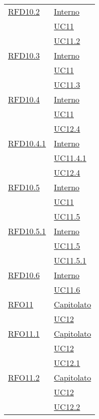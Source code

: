 \begin{longtable}{|>{\centering}m{5cm}|m{5cm}<{\centering}|}
\hyperlink{RFD10.2}{RFD10.2} & \hyperlink{Interno}{Interno}\\
& \hyperref[UC11]{UC11}\\
& \hyperref[UC11.2]{UC11.2}\\ \hline

\hyperlink{RFD10.3}{RFD10.3} & \hyperlink{Interno}{Interno}\\
& \hyperref[UC11]{UC11}\\
& \hyperref[UC11.3]{UC11.3}\\ \hline

\hyperlink{RFD10.4}{RFD10.4} & \hyperlink{Interno}{Interno}\\
& \hyperref[UC11]{UC11}\\
& \hyperref[UC12.4]{UC12.4}\\ \hline

\hyperlink{RFD10.4.1}{RFD10.4.1} & \hyperlink{Interno}{Interno}\\
& \hyperref[UC11.4.1]{UC11.4.1}\\
& \hyperref[UC12.4]{UC12.4}\\ \hline

\hyperlink{RFD10.5}{RFD10.5} & \hyperlink{Interno}{Interno}\\
& \hyperref[UC11]{UC11}\\
& \hyperref[UC11.5]{UC11.5}\\ \hline

\hyperlink{RFD10.5.1}{RFD10.5.1} & \hyperlink{Interno}{Interno}\\
& \hyperref[UC11.5]{UC11.5}\\
& \hyperref[UC11.5.1]{UC11.5.1}\\ \hline

\hyperlink{RFD10.6}{RFD10.6} & \hyperlink{Interno}{Interno}\\
& \hyperref[UC11.6]{UC11.6}\\ \hline

\hyperlink{RFO11}{RFO11} & \hyperlink{Capitolato}{Capitolato}\\
& \hyperref[UC12]{UC12}\\ \hline

\hyperlink{RFO11.1}{RFO11.1} & \hyperlink{Capitolato}{Capitolato}\\
& \hyperref[UC12]{UC12}\\
& \hyperref[UC12.1]{UC12.1}\\ \hline

\hyperlink{RFO11.2}{RFO11.2} & \hyperlink{Capitolato}{Capitolato}\\
& \hyperref[UC12]{UC12}\\
& \hyperref[UC12.2]{UC12.2}\\ \hline


\end{longtable}
